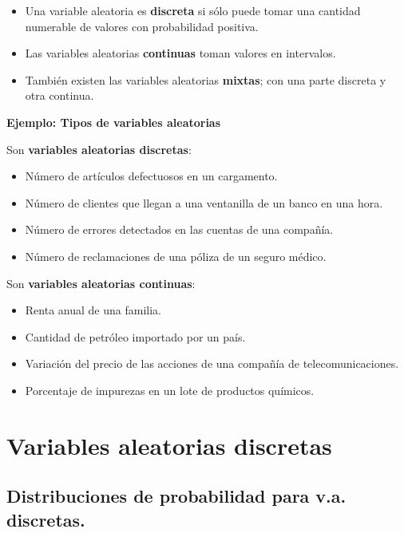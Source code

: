 \documentclass[
  letterpaper,
  DIV=11,
  numbers=noendperiod]{scrreprt}
\providecommand{\tightlist}{%
  \setlength{\itemsep}{0pt}\setlength{\parskip}{0pt}}\usepackage{longtable,booktabs,array}
\begin{document}
\begin{itemize}
\tightlist
\item
  Una variable aleatoria es \textbf{discreta} si sólo puede tomar una
  cantidad numerable de valores con probabilidad positiva.
\item
  Las variables aleatorias \textbf{continuas} toman valores en
  intervalos.
\item
  También existen las variables aleatorias \textbf{mixtas}; con una
  parte discreta y otra continua.
\end{itemize}

\textbf{Ejemplo: Tipos de variables aleatorias}

Son \textbf{variables aleatorias discretas}:

\begin{itemize}
\tightlist
\item
  Número de artículos defectuosos en un cargamento.
\item
  Número de clientes que llegan a una ventanilla de un banco en una
  hora.
\item
  Número de errores detectados en las cuentas de una compañía.
\item
  Número de reclamaciones de una póliza de un seguro médico.
\end{itemize}

Son \textbf{variables aleatorias continuas}:

\begin{itemize}
\tightlist
\item
  Renta anual de una familia.
\item
  Cantidad de petróleo importado por un país.
\item
  Variación del precio de las acciones de una compañía de
  telecomunicaciones.
\item
  Porcentaje de impurezas en un lote de productos químicos.
\end{itemize}

\hypertarget{variables-aleatorias-discretas}{%
\section{Variables aleatorias
discretas}\label{variables-aleatorias-discretas}}

\hypertarget{distribuciones-de-probabilidad-para-v.a.-discretas.}{%
\subsection{Distribuciones de probabilidad para v.a.
discretas.}\label{distribuciones-de-probabilidad-para-v.a.-discretas.}}
\end{document}
